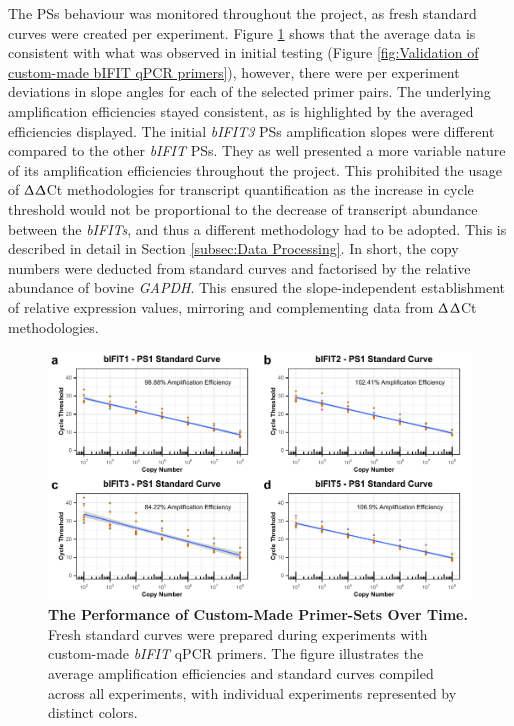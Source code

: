 The PSs behaviour was monitored throughout the project, as fresh standard curves were created per experiment. Figure \ref{fig:The Performance of Custom Made Primer Sets Over Time} shows that the average data is consistent with what was observed in initial testing (Figure \ref{fig:Validation of custom-made bIFIT qPCR primers}), however, there were per experiment deviations in slope angles for each of the selected primer pairs. The underlying amplification efficiencies stayed consistent, as is highlighted by the averaged efficiencies displayed. The initial \textit{bIFIT3} PSs amplification slopes were different compared to the other \textit{bIFIT} PSs. They as well presented a more variable nature of its amplification efficiencies throughout the project. This prohibited the usage of $\Updelta$$\Updelta$Ct methodologies for transcript quantification as the increase in cycle threshold would not be proportional to the decrease of transcript abundance between the \textit{bIFITs}, and thus a different methodology had to be adopted. This is described in detail in Section \ref{subsec:Data Processing}. In short, the copy numbers were deducted from standard curves and factorised by the relative abundance of bovine \textit{GAPDH}. This ensured the slope-independent establishment of relative expression values, mirroring and complementing data from $\Updelta$$\Updelta$Ct methodologies.

\begin{figure}
    \centering
    \includegraphics[width=1\linewidth]{07. Chapter 2/Figs/01. Technologies/03. standard curves behaviour.pdf}
    \caption[The Performance of Custom-Made Primer-Sets Over Time.]{\textbf{The Performance of Custom-Made Primer-Sets Over Time.} Fresh standard curves were prepared during experiments with custom-made \textit{bIFIT} qPCR primers. The figure illustrates the average amplification efficiencies and standard curves compiled across all experiments, with individual experiments represented by distinct colors.}
    \label{fig:The Performance of Custom Made Primer Sets Over Time}
\end{figure}

